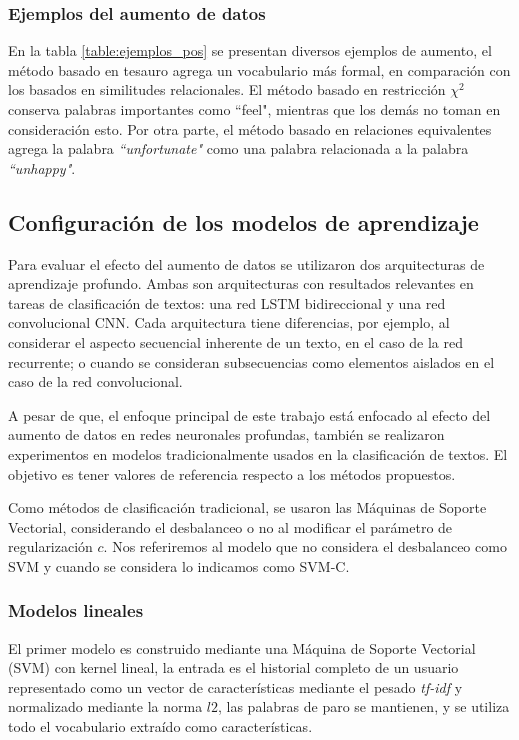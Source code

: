 

\subsubsection{Ejemplos del aumento de datos}
En la tabla \ref{table:ejemplos_pos} se presentan diversos ejemplos de aumento, el método basado en tesauro agrega un vocabulario más formal, en comparación con los basados en similitudes relacionales. El método basado en restricción $\chi^2$ conserva palabras importantes como ``feel", mientras que los demás no toman en consideración esto. Por otra parte, el método basado en relaciones equivalentes agrega la palabra \textit{``unfortunate"} como una palabra relacionada a la palabra \textit{``unhappy"}. 




 
\subsection{Configuración de los modelos de aprendizaje}

Para evaluar el efecto del aumento de datos se utilizaron dos arquitecturas de aprendizaje profundo. Ambas son arquitecturas con resultados relevantes en tareas de clasificación de textos: una red LSTM bidireccional y una red convolucional CNN. Cada arquitectura tiene diferencias, por ejemplo, al considerar el aspecto secuencial inherente de un texto, en el caso de la red recurrente; o cuando se consideran subsecuencias como elementos aislados en el caso de la red convolucional.

A pesar de que, el enfoque principal de este trabajo está enfocado al efecto del aumento de datos en redes neuronales profundas, también se realizaron experimentos en modelos tradicionalmente usados en la clasificación de textos. El objetivo es tener valores de referencia respecto a los métodos propuestos. 

Como métodos de clasificación tradicional, se usaron las Máquinas de Soporte Vectorial, considerando el desbalanceo o no al modificar el parámetro de regularización $c$. Nos referiremos al modelo que no considera el desbalanceo como SVM y cuando se considera lo indicamos como SVM-C. 


\subsubsection{Modelos lineales}
 El primer modelo es construido mediante una Máquina de Soporte Vectorial (SVM) con kernel lineal, la entrada es el historial completo de un usuario representado como un vector de características mediante el pesado \textit{tf-idf} y normalizado mediante la norma $l2$, las palabras de paro se mantienen, y se utiliza todo el vocabulario extraído como características. 
 
